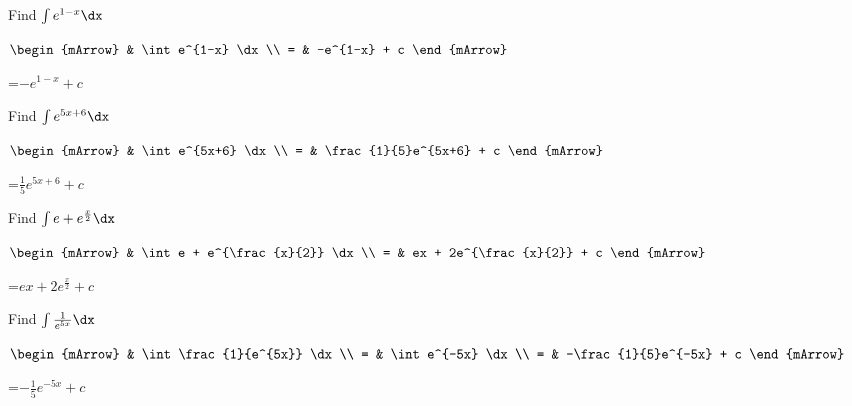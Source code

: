 \begin{mtask}
   \task \begin{exercise} Find $\int e^{1-x} \dx$
           \begin{envSolution}
             $\begin{mArrow}
                   & \int e^{1-x} \dx           \\
		   		 = & -e^{1-x} + c              
              \end{mArrow}$
            \begin{shortsolution}  
			     =$-e^{1-x} + c $
			\end{shortsolution}				 
           \end{envSolution}
         \end{exercise}

   \task \begin{exercise} Find $\int e^{5x+6} \dx$
           \begin{envSolution}
             $\begin{mArrow}
                   & \int e^{5x+6} \dx           \\
				 = & \frac{1}{5}e^{5x+6} + c  
              \end{mArrow}$
            \begin{shortsolution}  
			     =$ \frac{1}{5}e^{5x+6} + c $
			\end{shortsolution}				 
           \end{envSolution}
         \end{exercise}

   \task \begin{exercise} Find $\int e + e^{\frac{x}{2}} \dx$
           \begin{envSolution}
             $\begin{mArrow}
                   & \int e + e^{\frac{x}{2}} \dx     \\
		   		 = & ex + 2e^{\frac{x}{2}} + c    
              \end{mArrow}$
            \begin{shortsolution}  
			     =$ ex + 2e^{\frac{x}{2}} + c$
			\end{shortsolution}				 
           \end{envSolution}
         \end{exercise}

   \task \begin{exercise} Find $\int \frac{1}{e^{5x}} \dx$
           \begin{envSolution}
             $\begin{mArrow}
                   & \int \frac{1}{e^{5x}} \dx             \\
		   		 = & \int e^{-5x}          \dx             \\
				 = & -\frac{1}{5}e^{-5x} + c  
              \end{mArrow}$
            \begin{shortsolution}  
			     =$ -\frac{1}{5}e^{-5x} + c$
			\end{shortsolution}				 
           \end{envSolution}
         \end{exercise}


\end{mtask}
